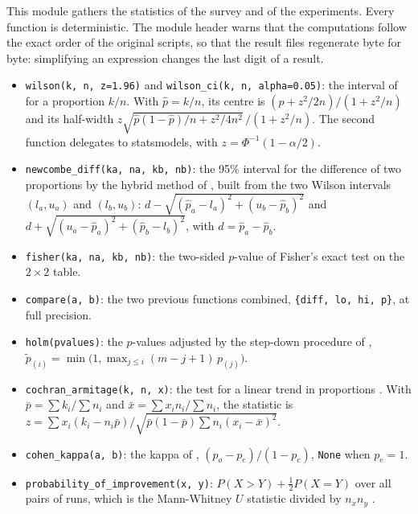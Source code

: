 This module gathers the statistics of the survey and of the experiments. Every function is
deterministic. The module header warns that the computations follow the exact order of the original
scripts, so that the result files regenerate byte for byte: simplifying an expression changes the
last digit of a result.
\begin{itemize}
  \item \texttt{wilson(k, n, z=1.96)} and \texttt{wilson\_ci(k, n, alpha=0.05)}: the interval of
        \textcite{wilson1927probable} for a proportion $k/n$. With $\hat p = k/n$, its centre is
        $(\hat p + z^2/2n)/(1 + z^2/n)$ and its half-width
        $z\sqrt{\hat p(1-\hat p)/n + z^2/4n^2}\,/(1 + z^2/n)$. The second function delegates to
        statsmodels, with $z = \Phi^{-1}(1-\alpha/2)$.
  \item \texttt{newcombe\_diff(ka, na, kb, nb)}: the 95\% interval for the difference of two
        proportions by the hybrid method of \textcite{newcombe1998interval}, built from the two
        Wilson intervals $(l_a, u_a)$ and $(l_b, u_b)$:
        $d - \sqrt{(\hat p_a - l_a)^2 + (u_b - \hat p_b)^2}$ and
        $d + \sqrt{(u_a - \hat p_a)^2 + (\hat p_b - l_b)^2}$, with $d = \hat p_a - \hat p_b$.
  \item \texttt{fisher(ka, na, kb, nb)}: the two-sided $p$-value of Fisher's exact test on the
        $2 \times 2$ table.
  \item \texttt{compare(a, b)}: the two previous functions combined, \texttt{\{diff, lo, hi, p\}}, at
        full precision.
  \item \texttt{holm(pvalues)}: the $p$-values adjusted by the step-down procedure of
        \textcite{holm1979simple}, $\tilde p_{(i)} = \min\bigl(1, \max_{j \le i}(m-j+1)\,p_{(j)}\bigr)$.
  \item \texttt{cochran\_armitage(k, n, x)}: the test for a linear trend in proportions
        \parencite{armitage1955tests}. With $\bar p = \sum k_i / \sum n_i$ and
        $\bar x = \sum x_i n_i / \sum n_i$, the statistic is
        $z = \sum x_i (k_i - n_i \bar p) \big/ \sqrt{\bar p(1-\bar p)\sum n_i (x_i - \bar x)^2}$.
  \item \texttt{cohen\_kappa(a, b)}: the kappa of \textcite{cohen1960coefficient},
        $(p_o - p_e)/(1 - p_e)$, \texttt{None} when $p_e = 1$.
  \item \texttt{probability\_of\_improvement(x, y)}: $P(X > Y) + \tfrac12 P(X = Y)$ over all pairs
        of runs, which is the Mann-Whitney $U$ statistic divided by $n_x n_y$
        \parencite{agarwal2021precipice}.

\end{itemize}
